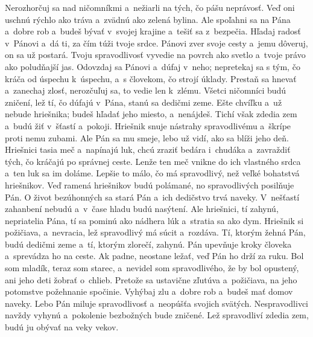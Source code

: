 Nerozhorčuj sa nad ničomníkmi
a~nežiarli na tých, čo pášu neprávosť.
\versseparator
Veď oni uschnú rýchlo ako tráva
a~zvädnú ako zelená bylina.
\versseparator
Ale spoľahni sa na Pána a~dobre rob
a~budeš bývať v~svojej krajine a~tešiť sa z~bezpečia.
\versseparator
Hľadaj radosť v~Pánovi
a~dá ti, za čím túži tvoje srdce.
\versseparator
Pánovi zver svoje cesty a~jemu dôveruj,
on sa už postará.
\versseparator
Tvoju spravodlivosť vyvedie na povrch ako svetlo
a~tvoje právo ako poludňajší jas.
Odovzdaj sa Pánovi a~dúfaj v~neho;
\versseparator
nepretekaj sa s tým, čo kráča od úspechu k~úspechu,
a~s človekom, čo strojí úklady.
\versseparator
Prestaň sa hnevať a~zanechaj zlosť,
nerozčuľuj sa, to vedie len k~zlému.
\versseparator
Všetci ničomníci budú zničení,
lež tí, čo dúfajú v~Pána, stanú sa dedičmi zeme.
\versseparator
Ešte chvíľku a~už nebude hriešnika;
budeš hľadať jeho miesto, a~nenájdeš.
\versseparator
Tichí však zdedia zem
a~budú žiť v~šťastí a~pokoji.
\versseparator
Hriešnik snuje nástrahy spravodlivému
a~škrípe proti nemu zubami.
\versseparator
Ale Pán sa mu smeje,
lebo už vidí, ako sa blíži jeho deň.
\versseparator
Hriešnici tasia meč
a~napínajú luk,
\versseparator
chcú zraziť bedára i~chudáka
a~zavraždiť tých, čo kráčajú po správnej ceste.
\versseparator
Lenže ten meč vnikne do ich vlastného srdca
a~ten luk sa im doláme.
\versseparator
Lepšie to málo, čo má spravodlivý,
než veľké bohatstvá hriešnikov.
\versseparator
Veď ramená hriešnikov budú polámané,
no spravodlivých posilňuje Pán.
\versseparator
O život bezúhonných sa stará Pán
a~ich dedičstvo trvá naveky.
\versseparator
V~nešťastí zahanbení nebudú
a~v~čase hladu budú nasýtení.
Ale hriešnici, tí zahynú,
\versseparator
nepriatelia Pána, tí sa pominú ako nádhera lúk
a~stratia sa ako dym.
\versseparator
Hriešnik si požičiava, a~nevracia,
lež spravodlivý má súcit a~rozdáva.
\versseparator
Tí, ktorým žehná Pán, budú dedičmi zeme
a~tí, ktorým zlorečí, zahynú.
\versseparator
Pán upevňuje kroky človeka
a~sprevádza ho na ceste.
\versseparator
Ak padne, neostane ležať,
veď Pán ho drží za ruku.
\versseparator
Bol som mladík, teraz som starec,
a~nevidel som spravodlivého, že by bol opustený,
ani jeho deti žobrať o~chlieb.
\versseparator
Pretože sa ustavične zľutúva a~požičiava,
na jeho potomstve požehnanie spočinie.
\versseparator
Vyhýbaj zlu a~dobre rob
a~budeš mať domov naveky.
\versseparator
Lebo Pán miluje spravodlivosť
a~neopúšťa svojich svätých.
\versseparator
Nespravodlivci navždy vyhynú
a~pokolenie bezbožných bude zničené.
\versseparator
Lež spravodliví zdedia zem,
budú ju obývať na veky vekov.
